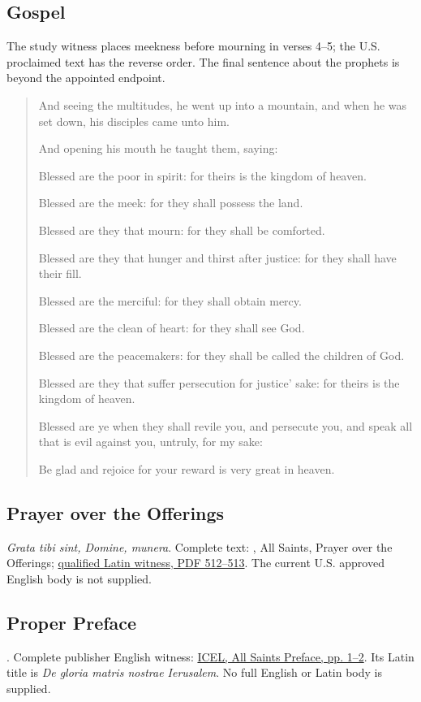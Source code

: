 \subsection{Gospel}
\label{proper-gospel}
The study witness places meekness before mourning in verses 4--5; the U.S. proclaimed text has the reverse order. The final sentence about the prophets is beyond the appointed endpoint.
\begin{quote}
And seeing the multitudes, he went up into a mountain, and when he was set down, his disciples came unto him.

And opening his mouth he taught them, saying:

Blessed are the poor in spirit: for theirs is the kingdom of heaven.

Blessed are the meek: for they shall possess the land.

Blessed are they that mourn: for they shall be comforted.

Blessed are they that hunger and thirst after justice: for they shall have their fill.

Blessed are the merciful: for they shall obtain mercy.

Blessed are the clean of heart: for they shall see God.

Blessed are the peacemakers: for they shall be called the children of God.

Blessed are they that suffer persecution for justice’ sake: for theirs is the kingdom of heaven.

Blessed are ye when they shall revile you, and persecute you, and speak all that is evil against you, untruly, for my sake:

Be glad and rejoice for your reward is very great in heaven.
\end{quote}

\subsection{Prayer over the Offerings}
\label{proper-prayer-over-offerings}
\textit{Grata tibi sint, Domine, munera}. Complete text: , All Saints, Prayer over the Offerings; \href{https://media.musicasacra.com/books/latin_missal2002.pdf#page=512}{qualified Latin witness, PDF 512--513}. The current U.S. approved English body is not supplied.

\subsection{Proper Preface}
\label{proper-proper-preface}
. Complete publisher English witness: \href{https://www.icelweb.org/musicfolder/73JerusalemD.pdf}{ICEL, All Saints Preface, pp. 1--2}. Its Latin title is \textit{De gloria matris nostrae Ierusalem}. No full English or Latin body is supplied.

